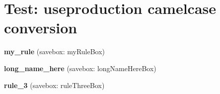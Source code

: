 \documentclass{article}
\begin{document}
\section*{Test: useproduction camelcase conversion}

\bigskip
\noindent\textbf{my\_rule} (savebox: myRuleBox)
\par\medskip
{}

\bigskip
\noindent\textbf{long\_name\_here} (savebox: longNameHereBox)
\par\medskip
{}

\bigskip
\noindent\textbf{rule\_3} (savebox: ruleThreeBox)
\par\medskip
{}
\end{document}
